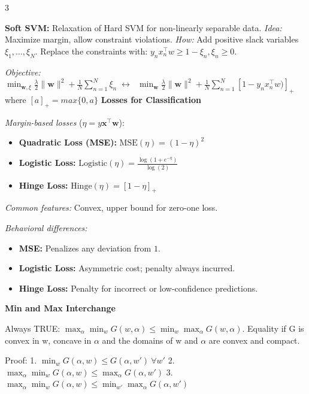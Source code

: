 \documentclass[landscape, 10pt]{article}
\begin{document}
\begin{multicols*}{3}
{\item \textbf{Soft SVM:} Relaxation of Hard SVM for non-linearly separable data.
\textit{Idea:} Maximize margin, allow constraint violations.  
\textit{How:} Add positive slack variables $\xi_1, \dots, \xi_N$.  
Replace the constraints with: $y_n x_n^\top w  \geq 1 - \xi_n, \xi_n \geq 0$.

\textit{Objective:}
$
\min_{\mathbf{w}, \xi} \frac{\lambda}{2} \|\mathbf{w}\|^2 + \frac{1}{N} \sum_{n=1}^N \xi_n \; \leftrightarrow \hspace{7pt} \min_{\mathbf{w}} \frac{\lambda}{2} \|\mathbf{w}\|^2 + \frac{1}{N} \sum_{n=1}^N [1 - y_n x_n^\top w)]_+
$
where $ [a]_+ = max\{0,a\}$
\textbf{Losses for Classification}

\textit{Margin-based losses} ($\eta = y \mathbf{x}^\top \mathbf{w}$):
\begin{itemize}
    \item \textbf{Quadratic Loss (MSE):} $\mathrm{MSE}(\eta) = (1 - \eta)^2$
    \item \textbf{Logistic Loss:} $\mathrm{Logistic}(\eta) = \frac{\log(1 + e^{-\eta})}{\log(2)}$
    \item \textbf{Hinge Loss:} $\mathrm{Hinge}(\eta) = [1 - \eta]_+$
\end{itemize}

\textit{Common features:} Convex, upper bound for zero-one loss.

\textit{Behavioral differences:}
\begin{itemize}
    \item \textbf{MSE:} Penalizes any deviation from $1$.
    \item \textbf{Logistic Loss:} Asymmetric cost; penalty always incurred.
    \item \textbf{Hinge Loss:} Penalty for incorrect or low-confidence predictions.
\end{itemize}
\item \textbf{Min and Max Interchange}

Always TRUE: $\max_\alpha \min_w G(w, \alpha) \leq \min_w \max_\alpha G(w, \alpha)$. Equality if G is convex in w, concave in $\alpha$ and the
domains of w and $\alpha$ are convex and compact. 

Proof:
1. $\min_w G(\alpha, w) \leq G(\alpha, w') \ \forall w'$
2. $\max_\alpha \min_w G(\alpha, w) \leq \max_\alpha G(\alpha, w')$
3. $\max_\alpha \min_w G(\alpha, w) \leq \min_{w'} \max_\alpha G(\alpha, w')$
}



\end{multicols*}
\end{document}
